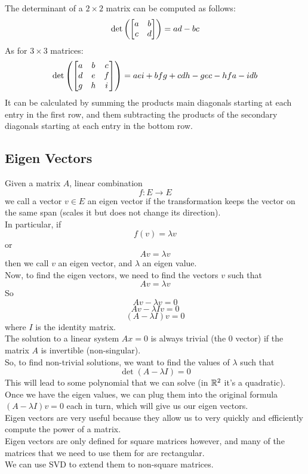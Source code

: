 \documentclass[12pt]{article}
\begin{document}
    The determinant of a $2 \times 2$ matrix
    can be computed as follows:
    \[ \det\left( \begin{bmatrix} a & b \\ c & d \end{bmatrix} \right) 
    = ad - bc \]
    As for $3 \times 3$ matrices:
    \[ \det\left( \begin{bmatrix} a & b & c \\ 
    d & e & f \\ g & h & i \end{bmatrix} \right) 
    = aei + bfg + cdh - gec - hfa - idb \]
    It can be calculated by summing
    the products main diagonals starting at each entry in
    the first row,
    and them subtracting the products
    of the secondary diagonals starting at each
    entry in the bottom row. \\

    \newpage

    \subsection*{Eigen Vectors}

    Given a matrix $A$, linear combination
    \[f: E \to E \]
    we call a vector $v \in E$ an eigen vector
    if the transformation keeps the vector
    on the same span
    (scales it but does not change its direction). \\
    In particular, if
    \[ f(v) = \lambda v \]
    or 
    \[ Av = \lambda v \]
    then we call $v$ an eigen vector,
    and $\lambda$ an eigen value. \\
    
    Now, to find the eigen vectors,
    we need to find the vectors $v$ such that 
    \[ Av = \lambda v \]
    So
    \[ Av - \lambda v = 0 \]
    \[ Av - \lambda I v = 0 \]
    \[ (A - \lambda I)v = 0 \]
    where $I$ is the identity matrix. \\

    The solution to a linear system $Ax = 0$
    is always trivial (the 0 vector)
    if the matrix $A$ is invertible (non-singular). \\
    So, to find non-trivial solutions,
    we want to find the values of $\lambda$
    such that 
    \[ \det(A - \lambda I) = 0\]
    This will lead to some polynomial that we
    can solve (in $\mathbb{R}^2$ it's a quadratic). \\
    
    Once we have the eigen values,
    we can plug them into 
    the original formula $(A - \lambda I)v = 0$
    each in turn, 
    which will give us our eigen vectors. \\
    
    Eigen vectors are very useful because
    they allow us to very quickly and efficiently
    compute the power of a matrix. \\
    Eigen vectors are only defined for square
    matrices however,
    and many of the matrices that we need to use them
    for are rectangular. \\
    We can use SVD to extend them to non-square matrices. \\
\end{document}

